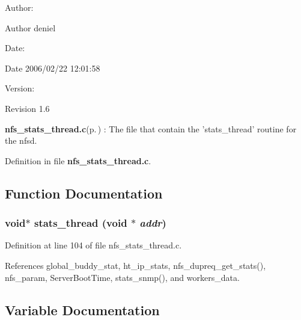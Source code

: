 \begin{Desc}
\item[Author:]\begin{Desc}
\item[Author]deniel \end{Desc}
\end{Desc}
\begin{Desc}
\item[Date:]\begin{Desc}
\item[Date]2006/02/22 12:01:58 \end{Desc}
\end{Desc}
\begin{Desc}
\item[Version:]\begin{Desc}
\item[Revision]1.6 \end{Desc}
\end{Desc}
{\bf nfs\_\-stats\_\-thread.c}{\rm (p.\,\pageref{nfs__stats__thread_8c})} : The file that contain the 'stats\_\-thread' routine for the nfsd.

Definition in file {\bf nfs\_\-stats\_\-thread.c}.

\subsection{Function Documentation}
\subsubsection{\setlength{\rightskip}{0pt plus 5cm}void$\ast$ stats\_\-thread (void $\ast$ {\em addr})}\label{nfs__stats__thread_8c_a3}




Definition at line 104 of file nfs\_\-stats\_\-thread.c.

References global\_\-buddy\_\-stat, ht\_\-ip\_\-stats, nfs\_\-dupreq\_\-get\_\-stats(), nfs\_\-param, Server\-Boot\-Time, stats\_\-snmp(), and workers\_\-data.

\subsection{Variable Documentation}
